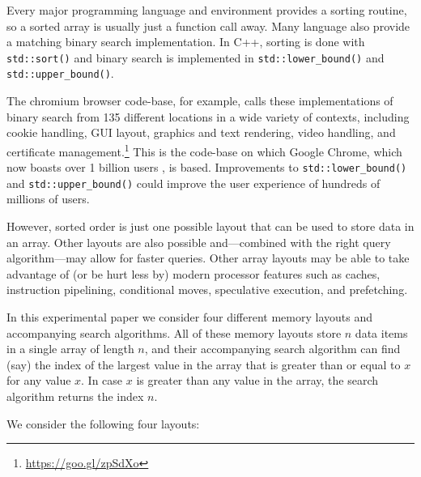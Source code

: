 \documentclass{patmorin}
\begin{document}
Every major programming language and environment provides a sorting
routine, so a sorted array is usually just a function call away. Many
language also provide a matching binary search implementation.
In C++, sorting is done with \texttt{std::sort()} and binary
search is implemented in \texttt{std::lower_bound()} and
\texttt{std::upper_bound()}.

The chromium browser code-base, for example, calls these
implementations of binary search from 135 different locations
in a wide variety of contexts, including cookie handling, GUI
layout, graphics and text rendering, video handling, and certificate
management.\footnote{\url{https://goo.gl/zpSdXo}}  This is the code-base
on which Google Chrome, which now boasts over 1 billion users \cite{X},
is based. Improvements to \texttt{std::lower_bound()} and
\texttt{std::upper_bound()} could improve the user experience
of hundreds of millions of users.

However, sorted order is just one possible layout that can be used to
store data in an array. Other layouts are also possible and---combined
with the right query algorithm---may allow for faster queries.
Other array layouts may be able to take advantage of (or be hurt less
by) modern processor features such as caches, instruction pipelining,
conditional moves, speculative execution, and prefetching.

In this experimental paper we consider four different memory layouts and
accompanying search algorithms.  All of these memory layouts store $n$
data items in a single array of length $n$, and their accompanying search
algorithm can find (say) the index of the largest value in the array that
is greater than or equal to $x$ for any value $x$. In case $x$ is greater
than any value in the array, the search algorithm returns the index $n$.

We consider the following four layouts:
\end{document}
